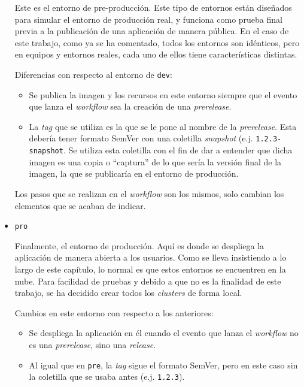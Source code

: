 \begin{itemize}
    Este es el entorno de pre-producción. Este tipo de entornos están diseñados para simular el entorno de producción real, y funciona como prueba final previa a la publicación de una aplicación de manera pública. En el caso de este trabajo, como ya se ha comentado, todos los entornos son idénticos, pero en equipos y entornos reales, cada uno de ellos tiene características distintas.

    Diferencias con respecto al entorno de \texttt{dev}:

    \begin{itemize}
      \item Se publica la imagen y los recursos en este entorno siempre que el evento que lanza el \textit{workflow} sea la creación de una \textit{prerelease}.
      \item La \textit{tag} que se utiliza es la que se le pone al nombre de la \textit{prerelease}. Esta debería tener formato SemVer\cite{semver} con una coletilla \textit{snapshot} (e.j. \texttt{1.2.3-snapshot}. Se utiliza esta coletilla con el fin de dar a entender que dicha imagen es una copia o ``captura'' de lo que sería la versión final de la imagen, la que se publicaría en el entorno de producción.
    \end{itemize}

    Los pasos que se realizan en el \textit{workflow} son los mismos, solo cambian los elementos que se acaban de indicar.

  \item \texttt{pro}

    Finalmente, el entorno de producción. Aquí es donde se despliega la aplicación de manera abierta a los usuarios. Como se lleva insistiendo a lo largo de este capítulo, lo normal es que estos entornos se encuentren en la nube. Para facilidad de pruebas y debido a que no es la finalidad de este trabajo, se ha decidido crear todos los \textit{clusters} de forma local.

    Cambios en este entorno con respecto a los anteriores:

    \begin{itemize}
      \item Se despliega la aplicación en él cuando el evento que lanza el \textit{workflow} no es una \textit{prerelease}, sino una \textit{release}.
      \item Al igual que en \texttt{pre}, la \textit{tag} sigue el formato SemVer, pero en este caso sin la coletilla que se usaba antes (e.j. \texttt{1.2.3}).
    \end{itemize}

\end{itemize}

